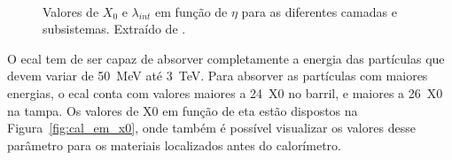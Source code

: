 \begin{figure}[ht!]

    \begin{center}
    
        \hspace{0.02\textwidth}
        \\ 

    \end{center}
    
    \caption[Valores de $X_0$ e $\lambda_{int}$ em função de $\eta$ para as diferentes camadas e subsistemas.]
    {Valores de $X_0$ e $\lambda_{int}$ em função de $\eta$ para as diferentes
camadas e subsistemas. Extraído de \cite{cal_tdr}.}

\end{figure}


O \gls{ecal} tem de ser capaz de absorver completamente a energia
das partículas que devem variar de 50~MeV até 3~TeV. 
Para absorver as partículas com maiores energias, o \gls{ecal} conta com valores
maiores a 24~\gls{X0} no barril, e maiores a 26~\gls{X0} na tampa. Os valores de \gls{X0} em 
função de \gls{eta} estão dispostos na Figura~\ref{fig:cal_em_x0}, onde também é possível
visualizar os valores desse parâmetro para os materiais localizados antes do
calorímetro.

